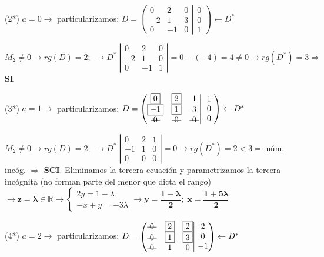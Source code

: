 \begin{proofw}
\noindent (2*) $a=0 \to$ particularizamos: $ D=\left( \begin{matrix}   \boxed{0}&\boxed{2}&0\\\boxed{-2}&\boxed{1}&3\\0&-1&0     \end{matrix} \right|  \left.    \begin{matrix}  0\\0\\1  \end{matrix} \right) \leftarrow D^*$

\noindent $\boxed{M_2}\neq 0 \to rg(D)=2; \;\to D^* \; \left| \begin{matrix} 0&2&0\\-2&1&0\\0&-1&1 \end{matrix} \right|=0-(-4)=4\neq 0 \to rg(D^*)=3 \Rightarrow $ \textbf{SI}

\noindent (3*) $a=1 \to$ particularizamos:  $ D=\left( \begin{matrix}   \boxed{0}&\boxed{2}&1\\\boxed{-1}&\boxed{1}&3\\\text{\textst{ 0 }}&\text{\textst{ 0 }}&\text{\textst{ 0 }}     \end{matrix} \right|  \left.    \begin{matrix}  1\\0\\\text{\textst{ 0 }}  \end{matrix} \right) \leftarrow D^*$

\noindent $\boxed{M_2}\neq 0 \to rg(D)=2; \;\to D^* \; \left| \begin{matrix} 0&2&1\\-1&1&0\\0&0&0 \end{matrix} \right|= 0 \to rg(D^*)=2 < 3 =$ núm. incóg. $ \Rightarrow $ \textbf{SCI}.  Eliminamos la tercera ecuación y parametrizamos la tercera incógnita (no forman parte del menor que dicta el rango) $\to \boldsymbol{z=\lambda} \in \mathbb R \longrightarrow \begin{cases} 2y=1-\lambda \\ -x+y=-3\lambda \end{cases} \to \boldsymbol{y=\dfrac {1-\lambda}{2}; \; x=\dfrac {1+5\lambda}{2}}$


\noindent (4*) $a=2 \to$ particularizamos:  $ D=\left( \begin{matrix}   \text{\textst{ 0 }}&\boxed{2}&\boxed{2}\\ \text{\textst{ 0 }}&\boxed{1}&\boxed{3}\\ \text{\textst{ 0 }}&1&0     \end{matrix} \right|  \left.    \begin{matrix}  2\\0\\-1  \end{matrix} \right) \leftarrow D^*$


\end{proofw}
